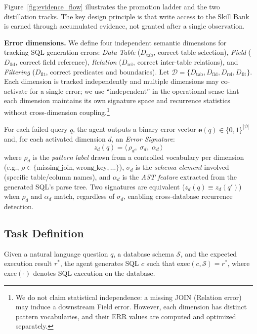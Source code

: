 Figure~\ref{fig:evidence_flow} illustrates the promotion ladder and the two distillation tracks. The key design principle is that write access to the Skill Bank is earned through accumulated evidence, not granted after a single observation.

\textbf{Error dimensions.} We define four independent semantic dimensions for tracking SQL generation errors: \emph{Data Table} ($D_{\text{tab}}$, correct table selection), \emph{Field} ($D_{\text{fld}}$, correct field reference), \emph{Relation} ($D_{\text{rel}}$, correct inter-table relations), and \emph{Filtering} ($D_{\text{flt}}$, correct predicates and boundaries). Let $\mathcal{D} = \{D_{\text{tab}}, D_{\text{fld}}, D_{\text{rel}}, D_{\text{flt}}\}$. Each dimension is tracked independently and multiple dimensions may co-activate for a single error; we use ``independent'' in the operational sense that each dimension maintains its own signature space and recurrence statistics without cross-dimension coupling.\footnote{We do not claim statistical independence: a missing JOIN (Relation error) may induce a downstream Field error. However, each dimension has distinct pattern vocabularies, and their ERR values are computed and optimized separately.}

For each failed query $q$, the agent outputs a binary error vector $\mathbf{e}(q) \in \{0,1\}^{|\mathcal{D}|}$ and, for each activated dimension $d$, an \emph{Error Signature}:
\begin{equation}
  z_d(q) = \langle\, \rho_d,\; \sigma_d,\; \alpha_d \,\rangle
  \label{eq:error_sig}
\end{equation}
where $\rho_d$ is the \emph{pattern label} drawn from a controlled vocabulary per dimension (e.g., $\rho \in \{\text{missing\_join}, \text{wrong\_key}, \ldots\}$), $\sigma_d$ is the \emph{schema element} involved (specific table/column names), and $\alpha_d$ is the \emph{AST feature} extracted from the generated SQL's parse tree. Two signatures are equivalent ($z_d(q) \equiv z_d(q')$) when $\rho_d$ and $\alpha_d$ match, regardless of $\sigma_d$, enabling cross-database recurrence detection.

\subsection{Task Definition}
\label{subsec:task}

Given a natural language question $q$, a database schema $\mathcal{S}$, and the expected execution result $r^*$, the agent generates SQL $c$ such that $\text{exec}(c, \mathcal{S}) = r^*$, where $\text{exec}(\cdot)$ denotes SQL execution on the database.

